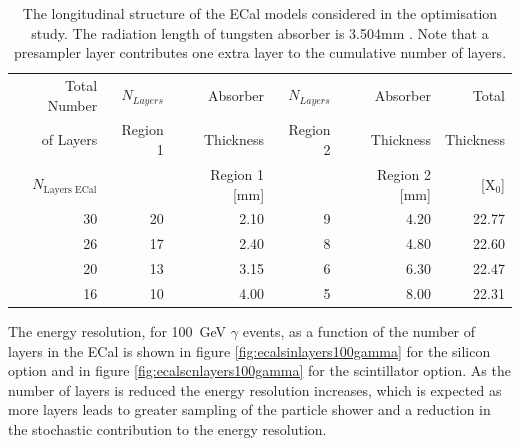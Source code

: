 \begin{table}[h!]
\centering
\begin{tabular}{ r r r r r r}
\hline
Total Number & $N_{Layers}$ & Absorber & $N_{Layers}$ & Absorber & Total  \\
of Layers & Region 1 & Thickness & Region 2 & Thickness & Thickness \\
$N_{\text{Layers ECal}}$ & & Region 1 [mm] & &  Region 2 [mm] &  [$\text{X}_{0}$] \\
\hline
30 & 20 & 2.10 & 9 & 4.20 & 22.77 \\
26 & 17 & 2.40 & 8 & 4.80 & 22.60 \\
20 & 13 & 3.15 & 6 & 6.30 & 22.47 \\
16 & 10 & 4.00 & 5 & 8.00 & 22.31\\
\hline
\end{tabular}
\caption[The longitudinal structure of the ECal models considered in the optimisation study.  The radiation length of tungsten absorber is 3.504mm \cite{Olive:2016xmw}.  Note that a presampler layer contributes one extra layer to the cumulative number of layers.]{The longitudinal structure of the ECal models considered in the optimisation study.  The radiation length of tungsten absorber is 3.504mm \cite{Olive:2016xmw}.  Note that a presampler layer contributes one extra layer to the cumulative number of layers.}
\label{table:nlayersecaloption}
\end{table}

The energy resolution, for 100~GeV $\gamma$ events, as a function of the number of layers in the ECal is shown in figure \ref{fig:ecalsinlayers100gamma} for the silicon option and in figure \ref{fig:ecalscnlayers100gamma} for the scintillator option.  As the number of layers is reduced the energy resolution increases, which is expected as more layers leads to greater sampling of the particle shower and a reduction in the stochastic contribution to the energy resolution.  

